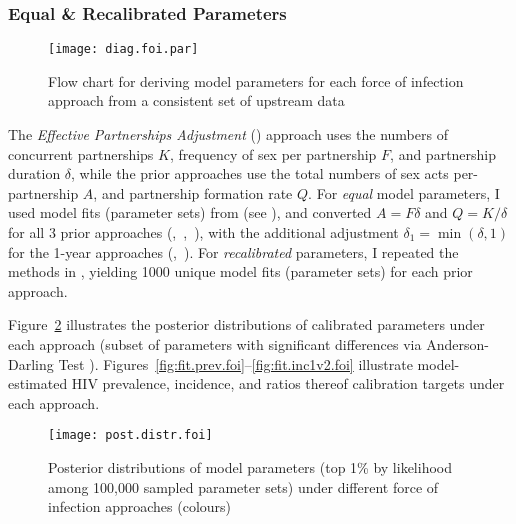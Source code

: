 \subsubsection{Equal \& Recalibrated Parameters}\label{foi.exp.model.par}
\begin{figure}
  \centering\texttt{[image: diag.foi.par]}
  \caption{Flow chart for deriving model parameters for each force of infection approach
    from a consistent set of upstream data}
  \label{fig:diag.foi.par}
\end{figure}
The \emph{Effective Partnerships Adjustment} (\epa) approach uses the
numbers of concurrent partnerships $K$,
frequency of sex per partnership $F$,
and partnership duration $\delta$,
while the prior approaches use the
total numbers of sex acts per-partnership $A$,
and partnership formation rate $Q$.
For \emph{equal} model parameters,
I used model fits (parameter sets) from \epa (see ),
and converted $A = F \delta$ and $Q = K/\delta$ for all 3 prior approaches (\ird,~\iry,~\ipy),
with the additional adjustment $\delta_1 = \min{(\delta,1)}$ for the 1-year approaches (\iry,~\ipy).
For \emph{recalibrated} parameters, I repeated the methods in ,
yielding 1000 unique model fits (parameter sets) for each prior approach.
\par
Figure~\ref{fig:post.distr.foi} illustrates
the posterior distributions of calibrated parameters under each approach
(subset of parameters with significant differences via Anderson-Darling Test \cite{Scholz1987}).
Figures~\ref{fig:fit.prev.foi}--\ref{fig:fit.inc1v2.foi} illustrate
model-estimated HIV prevalence, incidence, and ratios thereof
\vs calibration targets under each approach.
\begin{figure}
  \centering\texttt{[image: post.distr.foi]}
  \caption{Posterior distributions of model parameters
    (top 1\% by likelihood among 100,000 sampled parameter sets)
    under different force of infection approaches (colours)}
  \label{fig:post.distr.foi}
\end{figure}
